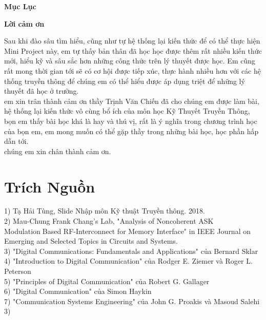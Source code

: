 \documentclass[a4paper]{article}
\begin{document}
\newpage
\begin{center}
    \fontsize{30pt}{17pt}\selectfont
        \textbf{Mục Lục}
\end{center}
\renewcommand\contentsname{}
\tableofcontents
\newpage

\newpage
\begin{center}
    \fontsize{30pt}{17pt}\selectfont
        \textbf{Lời cảm ơn}
\end{center}
Sau khi đào sâu tìm hiểu, cũng như tự hệ thống lại kiến thức để có thể thực hiện
Mini Project này, em tự thấy bản thân đã học học được thêm rất nhiều kiến thức
mới, hiểu kỹ và sâu sắc hơn những công thức trên lý thuyết được học.
Em cũng rất mong thời gian tới sẽ có cơ hội được tiếp xúc, thực hành nhiều hơn
với các hệ thống truyền thông để chúng em có thể hiểu được áp dụng triệt để những
lý thuyết đã học ở trường.
\\
em xin trân thành cảm ơn thầy Trịnh Văn Chiến đã cho chúng em được làm bài, hệ thống lại kiến thức vô cùng bổ ích của môn học Kỹ Thuyết Truyền Thông, bọn em thấy bài học khá là hay và thú vị, rất là ý nghĩa trong chương trình học của bọn em, em mong muốn có thể gặp thầy trong những bài học, học phần hấp dẫn tới. \\
chúng em xin chân thành cảm ơn.
\newpage

\newpage

\newpage

\newpage
\section{Trích Nguồn}
1)  Tạ Hải Tùng, Slide Nhập môn Kỹ thuật Truyền thông. 2018. \\
2)  Mau-Chung Frank Chang’s Lab, "Analysis of Noncoherent ASK ModulationBased RF-Interconnect for Memory Interface" in IEEE Journal on Emerging and Selected Topics in Circuits and Systems.  \\
3) "Digital Communications: Fundamentals and Applications" của Bernard Sklar \\ 
4) "Introduction to Digital Communication" của Rodger E. Ziemer và Roger L. Peterson \\ 
5) "Principles of Digital Communication" của Robert G. Gallager \\ 
6) "Digital Communication" của Simon Haykin \\
7) "Communication Systems Engineering" của John G. Proakis và Masoud Salehi \\ 
3) 
\end{document}
